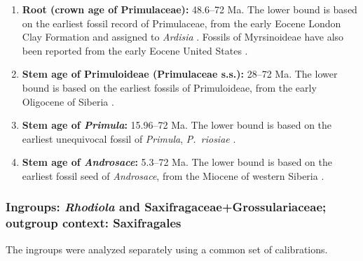 \begin{enumerate}
\item \textbf{Root (crown age of Primulaceae):} 48.6--72 Ma. The lower
  bound is based on the earliest fossil record of Primulaceae, from
  the early Eocene London Clay Formation and assigned to
  \textit{Ardisia} \citep{Collinson1984}. Fossils of Myrsinoideae have
  also been reported from the early Eocene United States
  \citep{Irving1971}.

\item \textbf{Stem age of Primuloideae (Primulaceae s.s.):} 28--72
  Ma. The lower bound is based on the earliest fossils of
  Primuloideae, from the early Oligocene of Siberia
  \citep{Nikitin2006}.

\item \textbf{Stem age of \textit{Primula}:} 15.96--72 Ma. The lower
  bound is based on the earliest unequivocal fossil of
  \textit{Primula}, \textit{P.~riosiae} \citep{deVos2014}.

\item \textbf{Stem age of \textit{Androsace}:} 5.3--72 Ma. The lower
  bound is based on the earliest fossil seed of \textit{Androsace},
  from the Miocene of western Siberia \citep{Dorofeev1963}.
\end{enumerate}


\subsubsection*{Ingroups: \textit{Rhodiola} and
  Saxifragaceae+Grossulariaceae; outgroup context: Saxifragales}

The ingroups were analyzed separately using a common set of
calibrations.

